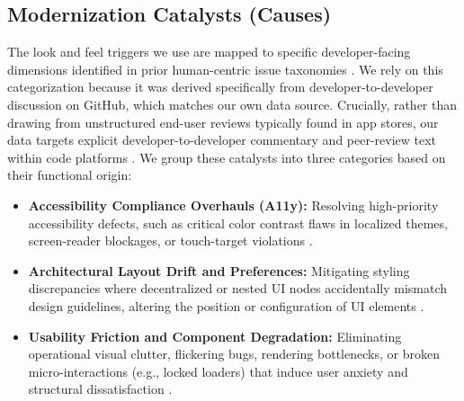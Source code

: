 \documentclass{article}
\begin{document}
\subsection{Modernization Catalysts (Causes)}
The look and feel triggers we use are mapped to specific developer-facing
dimensions identified in prior human-centric issue taxonomies
\cite{khalajzadeh2022how}. We rely on this categorization because it was
derived specifically from developer-to-developer discussion on GitHub,
which matches our own data source. Crucially, rather than drawing from
unstructured end-user reviews typically found in app stores, our data
targets explicit developer-to-developer commentary and peer-review text
within code platforms \cite{lamine2022understanding, cheng2018how}. We
group these catalysts into three categories based on their functional
origin:
\begin{itemize}
    \item \textbf{Accessibility Compliance Overhauls (A11y):} Resolving
    high-priority accessibility defects, such as critical color contrast
    flaws in localized themes, screen-reader blockages, or touch-target
    violations \cite{khalajzadeh2022how, llerena2019adapting}.
    \item \textbf{Architectural Layout Drift and Preferences:} Mitigating
    styling discrepancies where decentralized or nested UI nodes
    accidentally mismatch design guidelines, altering the position or
    configuration of UI elements \cite{khalajzadeh2022how}.
    \item \textbf{Usability Friction and Component Degradation:}
    Eliminating operational visual clutter, flickering bugs, rendering
    bottlenecks, or broken micro-interactions (e.g., locked loaders) that
    induce user anxiety and structural dissatisfaction
    \cite{khalajzadeh2022how, hellman2022characterizing}.
\end{itemize}
\end{document}
